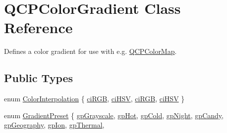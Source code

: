 \hypertarget{class_q_c_p_color_gradient}{}\section{Q\+C\+P\+Color\+Gradient Class Reference}
\label{class_q_c_p_color_gradient}


Defines a color gradient for use with e.\+g. \hyperlink{class_q_c_p_color_map}{Q\+C\+P\+Color\+Map}.  


\subsection*{Public Types}
\begin{DoxyCompactItemize}
\item 
enum \hyperlink{class_q_c_p_color_gradient_ac5dca17cc24336e6ca176610e7f77fc1}{Color\+Interpolation} \{ \hyperlink{class_q_c_p_color_gradient_ac5dca17cc24336e6ca176610e7f77fc1a18d3bb189bc5ac3c9ef345dad522fde4}{ci\+R\+GB}, 
\hyperlink{class_q_c_p_color_gradient_ac5dca17cc24336e6ca176610e7f77fc1a3662ff840f7db088d58e5bdb1105e3a4}{ci\+H\+SV}, 
\hyperlink{class_q_c_p_color_gradient_ac5dca17cc24336e6ca176610e7f77fc1a18d3bb189bc5ac3c9ef345dad522fde4}{ci\+R\+GB}, 
\hyperlink{class_q_c_p_color_gradient_ac5dca17cc24336e6ca176610e7f77fc1a3662ff840f7db088d58e5bdb1105e3a4}{ci\+H\+SV}
 \}
\item 
enum \hyperlink{class_q_c_p_color_gradient_aed6569828fee337023670272910c9072}{Gradient\+Preset} \{ \newline
\hyperlink{class_q_c_p_color_gradient_aed6569828fee337023670272910c9072a231b77e839ec2cf01e1573aae5bc4a35}{gp\+Grayscale}, 
\hyperlink{class_q_c_p_color_gradient_aed6569828fee337023670272910c9072ad899fc6ce4f4f957a017e9e60a55196d}{gp\+Hot}, 
\hyperlink{class_q_c_p_color_gradient_aed6569828fee337023670272910c9072ac9e62b3462c0837b4be0855a14c63ab6}{gp\+Cold}, 
\hyperlink{class_q_c_p_color_gradient_aed6569828fee337023670272910c9072a966669645266af90223fb69ac8baeb77}{gp\+Night}, 
\newline
\hyperlink{class_q_c_p_color_gradient_aed6569828fee337023670272910c9072ae15e7650a85bb33d5c1164ea26c5c6d4}{gp\+Candy}, 
\hyperlink{class_q_c_p_color_gradient_aed6569828fee337023670272910c9072a6deb5ec11029f48cf859be2b6f66d2b8}{gp\+Geography}, 
\hyperlink{class_q_c_p_color_gradient_aed6569828fee337023670272910c9072abe9934ecde531d948f89fe78e62bbd97}{gp\+Ion}, 
\hyperlink{class_q_c_p_color_gradient_aed6569828fee337023670272910c9072acbc3848125d37b0e6a1e9f4934868937}{gp\+Thermal}, 

\end{DoxyCompactItemize}
